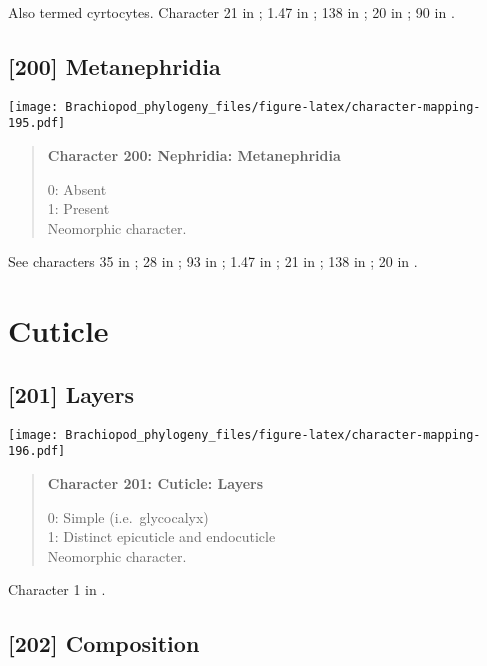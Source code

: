 \documentclass[openany]{book}
\theoremstyle{definition}
\theoremstyle{definition}
\theoremstyle{definition}
\theoremstyle{remark}
\begin{document}
Also termed cyrtocytes. Character 21 in \citet{Grobe2007}; 1.47 in
\citet{SPS1996}; 138 in \citet{Rouse1999}; 20 in \citet{Haszprunar1996};
90 in \citet{Glenner2004}.

\subsection*{{[}200{]} Metanephridia}\label{metanephridia}

\texttt{[image: Brachiopod\_phylogeny\_files/figure-latex/character-mapping-195.pdf]}

\begin{quote}
\textbf{Character 200: Nephridia: Metanephridia}

0: Absent\\
1: Present\\
Neomorphic character.
\end{quote}

See characters 35 in \citet{Rouse1999}; 28 in \citet{Haszprunar2000}; 93
in \citet{Glenner2004}; 1.47 in \citet{SPS1996}; 21 in
\citet{Grobe2007}; 138 in \citet{Rouse1999}; 20 in
\citet{Haszprunar1996}.

\section{Cuticle}\label{cuticle}

\subsection*{{[}201{]} Layers}\label{layers}

\texttt{[image: Brachiopod\_phylogeny\_files/figure-latex/character-mapping-196.pdf]}

\begin{quote}
\textbf{Character 201: Cuticle: Layers}

0: Simple (i.e.~glycocalyx)\\
1: Distinct epicuticle and endocuticle\\
Neomorphic character.
\end{quote}

Character 1 in \citet{Haszprunar1996}.

\subsection*{{[}202{]} Composition}\label{composition}
\end{document}
